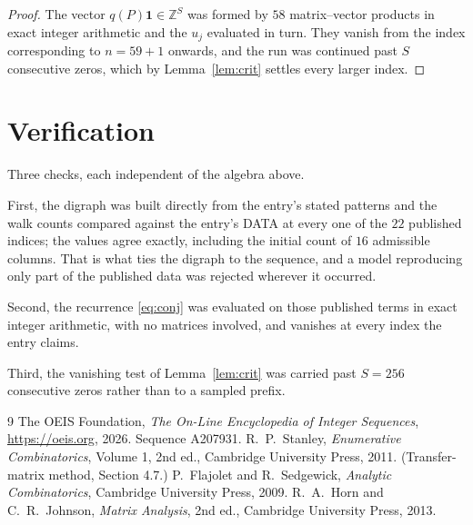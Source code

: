 \documentclass[11pt,a4paper]{article}
\theoremstyle{plain}
\theoremstyle{definition}
\begin{document}
\begin{proof}
The vector $q(P)\mathbf{1}\in\mathbb{Z}^{S}$ was formed by $58$ matrix--vector
products in exact integer arithmetic and the $u_j$ evaluated in turn. They vanish from the
index corresponding to $n=59+1$ onwards, and the run was continued past $S$ consecutive
zeros, which by Lemma~\ref{lem:crit} settles every larger index.
\end{proof}

\section{Verification}

Three checks, each independent of the algebra above.

First, the digraph was built directly from the entry's stated patterns and the walk counts
compared against the entry's DATA at every one of the $22$ published indices; the
values agree exactly, including the initial count of $16$ admissible columns. That is
what ties the digraph to the sequence, and a model reproducing only part of the published
data was rejected wherever it occurred.

Second, the recurrence \eqref{eq:conj} was evaluated on those published terms in exact
integer arithmetic, with no matrices involved, and vanishes at every index the entry claims.

Third, the vanishing test of Lemma~\ref{lem:crit} was carried past $S=256$ consecutive
zeros rather than to a sampled prefix.

\begin{thebibliography}{9}
 The OEIS Foundation, \emph{The On-Line Encyclopedia of Integer
Sequences}, \url{https://oeis.org}, 2026. Sequence A207931.
 R.~P.~Stanley, \emph{Enumerative Combinatorics}, Volume 1, 2nd ed.,
Cambridge University Press, 2011. (Transfer-matrix method, Section 4.7.)
 P.~Flajolet and R.~Sedgewick, \emph{Analytic Combinatorics}, Cambridge
University Press, 2009.
 R.~A.~Horn and C.~R.~Johnson, \emph{Matrix Analysis}, 2nd ed., Cambridge
University Press, 2013.
\end{thebibliography}
\end{document}
